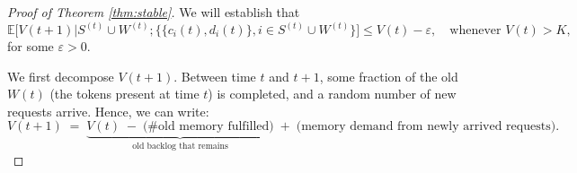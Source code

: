 \documentclass{article}
\theoremstyle{plain}
\theoremstyle{definition}
\theoremstyle{remark}
\begin{document}
\begin{proof}[Proof of Theorem \ref{thm:stable}]
We will establish that
\begin{equation}
\mathbb{E}\bigl[V(t+1)|S^{(t)}\cup W^{(t)};\{\{c_i(t),d_i(t)\},i\in S^{(t)}\cup W^{(t)}\}\bigr] \leq V(t) - \varepsilon, 
\quad \text{whenever } V(t) > K,
\label{eq:lya}
\end{equation}
for some \(\varepsilon > 0\).


We first decompose \(V(t+1)\). Between time \(t\) and \(t+1\), some fraction of the old \(W(t)\) (the tokens present at time \(t\)) is completed, and a random number of new requests arrive. 
Hence, we can write:
\begin{equation}
  V(t+1)
  \;=\;
  \underbrace{V(t)\;-\;\bigl(\text{\# old memory fulfilled}\bigr)}_{\text{old backlog that remains}}
  \;+\;
  \bigl(\text{memory demand from newly arrived requests}\bigr).
  \label{eq:recursion}
\end{equation}


\end{proof}
\end{document}
